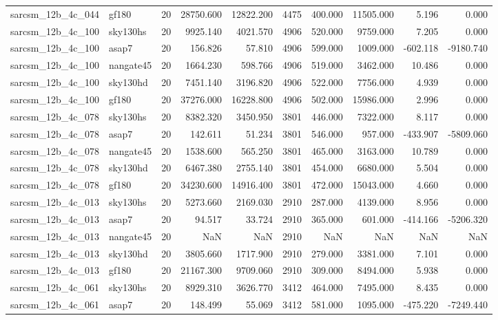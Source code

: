 \begin{tabular}{llrrrrrrrr}
sarcsm\_12b\_4c\_044 & gf180 & 20 & 28750.600 & 12822.200 & 4475 & 400.000 & 11505.000 & 5.196 & 0.000 \\
sarcsm\_12b\_4c\_100 & sky130hs & 20 & 9925.140 & 4021.570 & 4906 & 520.000 & 9759.000 & 7.205 & 0.000 \\
sarcsm\_12b\_4c\_100 & asap7 & 20 & 156.826 & 57.810 & 4906 & 599.000 & 1009.000 & -602.118 & -9180.740 \\
sarcsm\_12b\_4c\_100 & nangate45 & 20 & 1664.230 & 598.766 & 4906 & 519.000 & 3462.000 & 10.486 & 0.000 \\
sarcsm\_12b\_4c\_100 & sky130hd & 20 & 7451.140 & 3196.820 & 4906 & 522.000 & 7756.000 & 4.939 & 0.000 \\
sarcsm\_12b\_4c\_100 & gf180 & 20 & 37276.000 & 16228.800 & 4906 & 502.000 & 15986.000 & 2.996 & 0.000 \\
sarcsm\_12b\_4c\_078 & sky130hs & 20 & 8382.320 & 3450.950 & 3801 & 446.000 & 7322.000 & 8.117 & 0.000 \\
sarcsm\_12b\_4c\_078 & asap7 & 20 & 142.611 & 51.234 & 3801 & 546.000 & 957.000 & -433.907 & -5809.060 \\
sarcsm\_12b\_4c\_078 & nangate45 & 20 & 1538.600 & 565.250 & 3801 & 465.000 & 3163.000 & 10.789 & 0.000 \\
sarcsm\_12b\_4c\_078 & sky130hd & 20 & 6467.380 & 2755.140 & 3801 & 454.000 & 6680.000 & 5.504 & 0.000 \\
sarcsm\_12b\_4c\_078 & gf180 & 20 & 34230.600 & 14916.400 & 3801 & 472.000 & 15043.000 & 4.660 & 0.000 \\
sarcsm\_12b\_4c\_013 & sky130hs & 20 & 5273.660 & 2169.030 & 2910 & 287.000 & 4139.000 & 8.956 & 0.000 \\
sarcsm\_12b\_4c\_013 & asap7 & 20 & 94.517 & 33.724 & 2910 & 365.000 & 601.000 & -414.166 & -5206.320 \\
sarcsm\_12b\_4c\_013 & nangate45 & 20 & NaN & NaN & 2910 & NaN & NaN & NaN & NaN \\
sarcsm\_12b\_4c\_013 & sky130hd & 20 & 3805.660 & 1717.900 & 2910 & 279.000 & 3381.000 & 7.101 & 0.000 \\
sarcsm\_12b\_4c\_013 & gf180 & 20 & 21167.300 & 9709.060 & 2910 & 309.000 & 8494.000 & 5.938 & 0.000 \\
sarcsm\_12b\_4c\_061 & sky130hs & 20 & 8929.310 & 3626.770 & 3412 & 464.000 & 7495.000 & 8.435 & 0.000 \\
sarcsm\_12b\_4c\_061 & asap7 & 20 & 148.499 & 55.069 & 3412 & 581.000 & 1095.000 & -475.220 & -7249.440 \\

\end{tabular}
